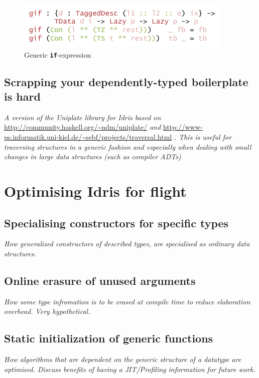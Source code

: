 \documentclass{ituthesis}
\theoremstyle{break}
\begin{document}
\begin{figure}[ht]
\begin{center}
    \includegraphics[scale=0.5]{Figures/GenericIf.png}
\end{center}
\caption{Generic \texttt{\textbf{if}}-expression}
\label{fig:ifgen}
\end{figure}



\section{Scrapping your dependently-typed boilerplate is hard}
\label{sec:Scrappingyourdependently-typedboilerplateishard}
\textit{A version of the Uniplate library for Idris based on} \url{http://community.haskell.org/~ndm/uniplate/} \textit{and} \url{http://www-ps.informatik.uni-kiel.de/~sebf/projects/traversal.html} \textit{.
This is useful for traversing structures in a generic fashion and especially when dealing with small changes in large data structures (such as compiler ADTs)}

\chapter{Optimising Idris for flight}
\label{cha:OptimizingIdrisforFlight}

\section{Specialising constructors for specific types}
\label{sec:SpecialisingConstructorsforSpecificTypes}
\textit{How generalized constructors of described types, are specialised as ordinary data structures.}

\section{Online erasure of unused arguments}
\label{sec:OnlineErasureofUnusedArguments}
\textit{How some type infromation is to be erased at compile time to reduce elaboration overhead. Very hypothetical.}

\section{Static initialization of generic functions}
\label{sec:StaticInitializationofGenericFunctions}
\textit{How algorithms that are dependent on the generic structure of a datatype are optimised. Discuss benefits of having a JIT/Profiling information for future work.}
\end{document}
